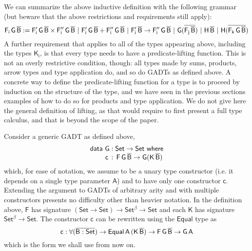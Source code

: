 \documentclass[9pt]{entcs} \usepackage{entcsmacro}
\begin{document}
We can summarize the above inductive definition with the following grammar
(but beware that the above restrictions and requirements still apply):
\[
\mathsf{F_i\,G\,\overline{B} :=
F_i'\,G\,\overline{B} \times F_i''\,G\,\overline{B}
\ \vert\ F_i'\,G\,\overline{B} + F_i''\,G\,\overline{B}
\ \vert\ F_i'\,\overline{B} \to F_i''\,G\,\overline{B}
\ \vert\ G(\overline{F_j\,\overline{B}})
\ \vert\ H\,\overline{B}
\ \vert\ H (\overline{F_k\,G\,\overline{B}})
}
\]
A further requirement that applies to all of the types appearing above,
including the types $\mathsf{K_i}$,
is that every type needs to have a predicate-lifting function.
This is not an overly restrictive condition, though:
all types made by sums, products, arrow types and type application do, and so do GADTs as defined above.
A concrete way to define the predicate-lifting function for a type is to proceed by induction on the structure of the type,
and we have seen in the previous sections examples of how to do so for products and type application.
We do not give here the general definition of lifting,
as that would require to first present a full type calculus,
and that is beyond the scope of the paper.


Consider a generic GADT as defined above,
\begin{equation}\label{eq:gadt}
\begin{array}{l}
\mathsf{data\ G : Set \to Set\ where}\\
\mathsf{\;\;\;\;\;\;\;\;c\, :\, F\,G\,\overline{B} \to G (K\,\overline{B})}
\end{array}
\end{equation}
which, for ease of notation,
we assume to be a unary type constructor (i.e. it depends on a single type parameter $\mathsf{A}$)
and to have only one constructor $\mathsf{c}$.
Extending the argument to GADTs of arbitrary arity and with multiple constructors presents no difficulty
other than heavier notation.
In the definition above, $\mathsf{F}$ has signature $\mathsf{(Set \to Set) \to Set^{\beta} \to Set}$
and each $\mathsf{K}$ has signature $\mathsf{Set^{\beta} \to Set}$.
The constructor $\mathsf{c}$ can be rewritten using the $\mathsf{Equal}$ type as
\[
\mathsf{c : \forall (\overline{B : Set}) \to Equal\,A\,(K\,\overline{B}) \to F\,G\,\overline{B} \to G\,A}
\]
which is the form we shall use from now on.
\end{document}
